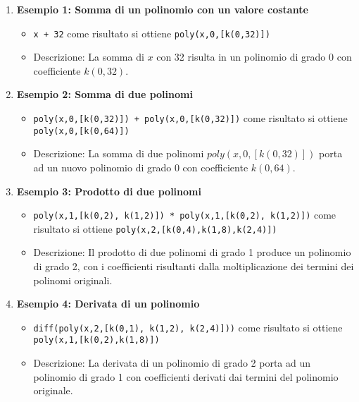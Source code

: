 \documentclass[12pt,twoside]{report}
\begin{document}
\begin{enumerate}
    \item \textbf{Esempio 1: Somma di un polinomio con un valore costante}
    \begin{itemize}
        \item \texttt{x + 32} come risultato si ottiene \texttt{poly(x,0,[k(0,32)])}
        \item Descrizione: La somma di \( x \) con 32 risulta in un polinomio di grado 0 con coefficiente \( k(0, 32) \).
    \end{itemize}
    
    \item \textbf{Esempio 2: Somma di due polinomi}
    \begin{itemize}
        \item \texttt{poly(x,0,[k(0,32)]) + poly(x,0,[k(0,32)])} come risultato si ottiene \\ \texttt{poly(x,0,[k(0,64)])}
        \item Descrizione: La somma di due polinomi \( poly(x, 0, [k(0,32)]) \) porta ad un nuovo polinomio di grado 0 con coefficiente \( k(0, 64) \).
    \end{itemize}
    
    \item \textbf{Esempio 3: Prodotto di due polinomi}
    \begin{itemize}
        \item \texttt{poly(x,1,[k(0,2), k(1,2)]) * poly(x,1,[k(0,2), k(1,2)])} come risultato si ottiene \texttt{poly(x,2,[k(0,4),k(1,8),k(2,4)])}
        \item Descrizione: Il prodotto di due polinomi di grado 1 produce un polinomio di grado 2, con i coefficienti risultanti dalla moltiplicazione dei termini dei polinomi originali.
    \end{itemize}
    
    \item \textbf{Esempio 4: Derivata di un polinomio}
    \begin{itemize}
        \item \texttt{diff(poly(x,2,[k(0,1), k(1,2), k(2,4)]))} come risultato si ottiene \\ \texttt{poly(x,1,[k(0,2),k(1,8)])}
        \item Descrizione: La derivata di un polinomio di grado 2 porta ad un polinomio di grado 1 con coefficienti derivati dai termini del polinomio originale.
    \end{itemize}
\end{enumerate}
\end{document}
